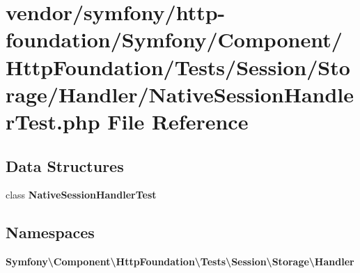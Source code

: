 \section{vendor/symfony/http-\/foundation/\+Symfony/\+Component/\+Http\+Foundation/\+Tests/\+Session/\+Storage/\+Handler/\+Native\+Session\+Handler\+Test.php File Reference}
\label{_native_session_handler_test_8php}
\subsection*{Data Structures}
\begin{DoxyCompactItemize}
\item 
class {\bf Native\+Session\+Handler\+Test}
\end{DoxyCompactItemize}
\subsection*{Namespaces}
\begin{DoxyCompactItemize}
\item 
 {\bf Symfony\textbackslash{}\+Component\textbackslash{}\+Http\+Foundation\textbackslash{}\+Tests\textbackslash{}\+Session\textbackslash{}\+Storage\textbackslash{}\+Handler}
\end{DoxyCompactItemize}
